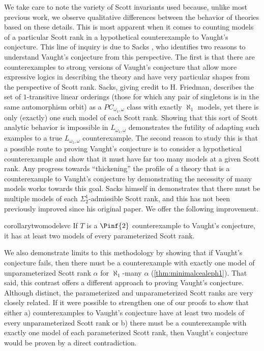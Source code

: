 \documentclass{amsart}
\renewcommand{\-}{\text{-}}
\begin{document}
We take care to note the variety of Scott invariants used because, unlike most previous work, we observe qualitative differences between the behavior of theories based on these details.
This is most apparent when it comes to counting models of a particular Scott rank in a hypothetical counterexample to Vaught's conjecture.
This line of inquiry is due to Sacks \cite{Sac83}, who identifies two reasons to understand Vaught's conjecture from this perspective.
The first is that there are counterexamples to strong versions of Vaught's conjecture that allow more expressive logics in describing the theory and have very particular shapes from the perspective of Scott rank.
Sacks, giving credit to H. Friedman, describes the set of $1$-transitive linear orderings (those for which any pair of singletons is in the same automorphism orbit) as a $PC_{\omega_1,\omega}$ class with exactly $\aleph_1$ models, yet there is only (exactly) one such model of each Scott rank.
Showing that this sort of Scott analytic behavior is impossible in $L_{\omega_1,\omega}$ demonstrates the futility of adapting such examples to a true $L_{\omega_1,\omega}$ counterexample.
The second reason to study this is that a possible route to proving Vaught's conjecture is to consider a hypothetical counterexample and show that it must have far too many models at a given Scott rank.
Any progress towards ``thickening'' the profile of a theory that is a counterexample to Vaught's conjecture by demonstrating the necessity of many models works towards this goal.
Sacks himself in \cite{Sac83} demonstrates that there must be multiple models of each $\Sigma_2^1$-admissible Scott rank, and this has not been previously improved since his original paper.
We offer the following improvement.
\begin{restatable*}{corollary}{twomodelsvc}\label{cor:2ModelsVC}
If $T$ is a $\Pinf{2}$ counterexample to Vaught's conjecture, it has at least two models of every parameterized Scott rank.
\end{restatable*}
We also demonstrate limits to this methodology by showing that if Vaught's conjecture fails, then there must be a counterexample with exactly one model of unparameterized Scott rank $\alpha$ for $\aleph_1$-many $\alpha$ (\cref{thm:minimalcealeph1}).
That said, this contrast offers a different approach to proving Vaught's conjecture.
Although distinct, the parameterized and unparameterized Scott ranks are very closely related.
If it were possible to strengthen one of our proofs to show that either a) counterexamples to Vaught's conjecture have at least two models of every unparameterized Scott rank or b) there must be a counterexample with exactly one model of each parameterized Scott rank, then Vaught's conjecture would be proven by a direct contradiction.
\end{document}

